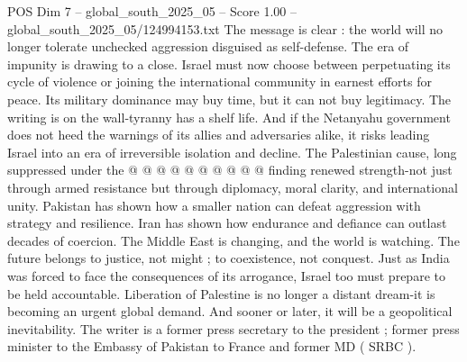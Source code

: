 \begin{textsample}{POS Dim 7 – global\_south\_2025\_05 – Score 1.00 – global\_south\_2025\_05/124994153.txt}
The message is clear : the world will no longer tolerate unchecked aggression disguised as self-defense.
The era of impunity is drawing to a close.
Israel must now choose between perpetuating its cycle of violence or joining the international community in earnest efforts for peace.
Its military dominance may buy time, but it can not buy legitimacy.
The writing is on the wall-tyranny has a shelf life.
And if the Netanyahu government does not heed the warnings of its allies and adversaries alike, it risks leading Israel into an era of irreversible isolation and decline.
The Palestinian cause, long suppressed under the @ @ @ @ @ @ @ @ @ @ finding renewed strength-not just through armed resistance but through diplomacy, moral clarity, and international unity.
Pakistan has shown how a smaller nation can defeat aggression with strategy and resilience.
Iran has shown how endurance and defiance can outlast decades of coercion.
The Middle East is changing, and the world is watching.
The future belongs to justice, not might ; to coexistence, not conquest.
Just as India was forced to face the consequences of its arrogance, Israel too must prepare to be held accountable.
Liberation of Palestine is no longer a distant dream-it is becoming an urgent global demand.
And sooner or later, it will be a geopolitical inevitability.
The writer is a former press secretary to the president ; former press minister to the Embassy of Pakistan to France and former MD ( SRBC ).

\end{textsample}
